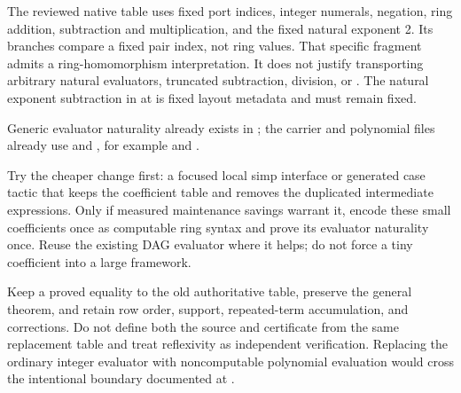 The reviewed native table uses fixed port indices, integer numerals,
negation, ring addition, subtraction and multiplication, and the fixed natural
exponent 2. Its branches compare a fixed pair index, not ring values. That
specific fragment admits a ring-homomorphism interpretation. It does not
justify transporting arbitrary natural evaluators, truncated subtraction,
division, or . The natural exponent subtraction in
 at  is fixed
layout metadata and must remain fixed.

\existing{} Generic evaluator naturality already exists in
; the carrier and polynomial files already
use  and , for example
 and
.

\proposed{} Try the cheaper change first: a focused local simp interface
or generated case tactic that keeps the coefficient table and removes the
duplicated intermediate expressions. Only if measured maintenance savings
warrant it, encode these small coefficients once as computable ring syntax
and prove its evaluator naturality once. Reuse the existing DAG evaluator
where it helps; do not force a tiny coefficient into a large framework.

\risk{} Keep a proved equality to the old authoritative table, preserve
the general  theorem, and retain row order, support,
repeated-term accumulation, and corrections. Do not define both the source
and certificate from the same replacement table and treat reflexivity as
independent verification. Replacing the ordinary integer evaluator with
noncomputable polynomial evaluation would cross the intentional boundary
documented at .

